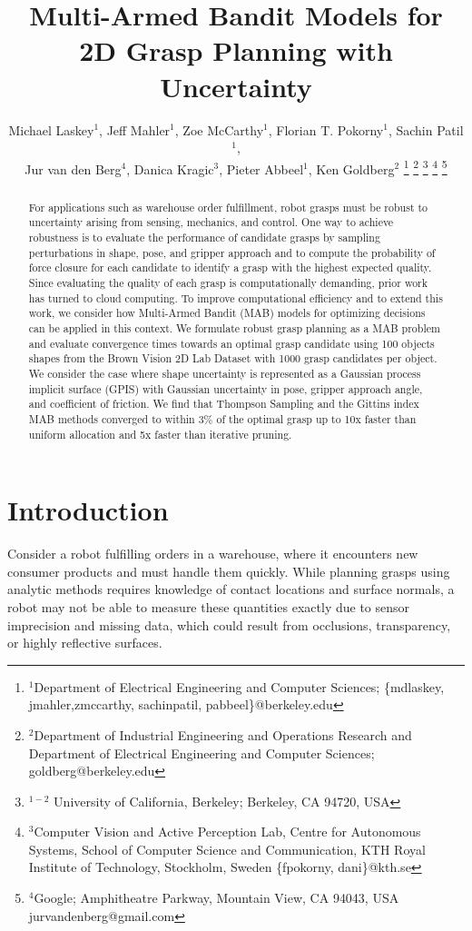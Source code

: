 \documentclass[10pt, conference]{ieeeconf}      %
\title{\LARGE \bf
Multi-Armed Bandit Models for 2D Grasp Planning with Uncertainty}
\author{Michael Laskey$^1$, Jeff Mahler$^1$, Zoe McCarthy$^1$,  Florian T. Pokorny$^1$, Sachin Patil$^1$,\\ Jur van den Berg$^4$,  Danica Kragic$^3$, Pieter Abbeel$^1$, Ken Goldberg$^2$%
\thanks{$^1$Department of Electrical Engineering and Computer Sciences; {\small \{mdlaskey, jmahler,zmccarthy, sachinpatil, pabbeel\}@berkeley.edu}}%
\thanks{$^2$Department of Industrial Engineering and Operations Research and Department of Electrical Engineering and Computer Sciences; {\small goldberg@berkeley.edu}}%
\thanks{$^{1-2}$ University of California, Berkeley;  Berkeley, CA 94720, USA}%
\thanks{$^3$Computer Vision and Active Perception Lab, Centre for Autonomous Systems, School of Computer Science and Communication, KTH Royal Institute of Technology, Stockholm, Sweden {\small \{fpokorny, dani\}@kth.se}}%
\thanks{$^4$Google; Amphitheatre Parkway, Mountain View, CA 94043, USA {\small jurvandenberg@gmail.com}}%
}
\begin{document}
\maketitle
\thispagestyle{empty}
\pagestyle{empty}



\begin{abstract}
For applications such as warehouse order fulfillment, robot grasps must be robust to uncertainty arising from sensing,
mechanics, and control.  One way to achieve robustness is to evaluate the performance of candidate grasps by sampling
perturbations in shape, pose, and gripper approach and to compute the probability of force closure for each candidate to
identify a grasp with the highest expected quality. Since evaluating the
quality of each grasp is computationally demanding, prior work has turned to cloud computing. To improve computational efficiency and to extend this work, we consider how
Multi-Armed Bandit (MAB) models for optimizing decisions can be applied in this context. We formulate robust grasp
planning as a MAB problem and evaluate convergence times towards an optimal grasp candidate using 100 objects shapes from
the Brown Vision 2D Lab Dataset with 1000 grasp candidates per object. We consider the case where shape uncertainty is represented as a Gaussian process implicit surface (GPIS) with Gaussian uncertainty in pose, gripper approach angle, and coefficient of friction. 
We find that Thompson Sampling and the Gittins index MAB methods converged to within 3\% of the optimal grasp up to 10x faster than uniform allocation and 5x faster than iterative pruning. 
\end{abstract}



\section{Introduction}



Consider a robot fulfilling orders in a warehouse, where it encounters new consumer products and must handle them quickly.
While planning grasps using analytic methods requires knowledge of contact locations and surface normals,
a robot may not be able to measure these quantities exactly due to sensor imprecision and missing data, which could result from occlusions, transparency, or highly reflective surfaces. 
\end{document}
